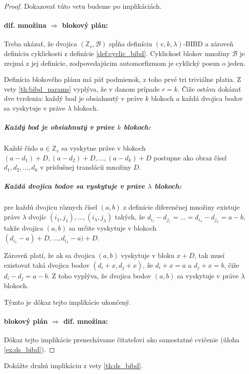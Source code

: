 \begin{proof}
Dokazovať túto vetu budeme po implikáciách.
\paragraph{dif. množina $\Longrightarrow$ blokový plán:}
Treba ukázať, že dvojica $(\mathbb{Z}_v, \mathcal{B})$ spĺňa definíciu $(v,k,\lambda)$-BIBD a zároveň definíciu cyklickosti z definície \ref{def:cyclic_bibd}.
Cyklickosť blokov množiny $\mathcal{B}$ je zrejmá z jej definície, zodpovedajúcim automorfizmom je cyklický posun o jeden.

Definícia blokového plánu má päť podmienok, z toho prvé tri triviálne platia. 
Z vety \ref{th:bibd_params} vyplýva, že v danom prípade $r = k$.
Čiže ostáva dokázať dve tvrdenia: každý bod je obsiahnutý v práve $k$ blokoch a každá dvojica bodov sa vyskytuje v práve $\lambda$ blokoch.

\subparagraph{Každý bod je obsiahnutý v práve $k$ blokoch:} Každé číslo $a \in \mathbb{Z}_v$ sa vyskytne práve v blokoch $(a - d_1) + D, (a - d_2) + D, \ldots, (a - d_k) + D$ postupne ako obraz čísel $d_1, d_2, \ldots, d_k$ v príslušnej translácii množiny $D$.

\subparagraph{Každá dvojica bodov sa vyskytuje v práve $\lambda$ blokoch:} pre každú dvojicu rôznych čísel $(a, b)$ z definície diferenčnej množiny existuje práve $\lambda$ dvojíc $(i_1, j_1), \ldots, (i_\lambda, j_\lambda)$ takých, že $d_{i_1} - d_{j_1} = \ldots = d_{i_\lambda} - d_{j_\lambda} = a - b$, takže dvojica $(a, b)$ sa určite vyskytuje v blokoch $(d_{i_1} - a) + D, \ldots, d_{i_\lambda} - a) + D$. 

Zároveň platí, že ak sa dvojica $(a, b)$ vyskytuje v bloku $x + D$, tak musí existovať taká dvojica bodov $(d_i + x, d_j + x)$, že $d_i + x = a$ a $d_j + x = b$, čiže $d_i - d_j = a-b$.
Z toho vyplýva, že dvojica bodov $(a, b)$ sa vyskytuje v práve $\lambda$ blokoch.

Týmto je dôkaz tejto implikácie ukončený.

\paragraph{blokový plán $\Longrightarrow$ dif. množina:}
Dôkaz tejto implikácie prenechávame čitateľovi ako samostatné cvičenie (úloha \ref{ex:ds_bibd}).
\end{proof}

\begin{exercise}
\label{ex:ds_bibd}
Dokážte druhú implikáciu z vety \ref{th:ds_bibd}.
\end{exercise}

